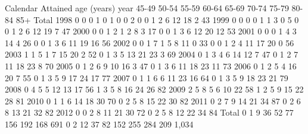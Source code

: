 Calendar  {\VBAR}                         Attained age (years)                        
year      {\VBAR} 45-49  50-54  55-59  60-64  65-69  70-74  75-79  80-84    85+  Total
     1998 {\VBAR}     0      0      0      1      0      1      0      0             2
          {\VBAR}     0      0      1      2      6     12     18      2            43
          {\VBAR} 
     1999 {\VBAR}     0      0      0      0      1      1      3      0             5
          {\VBAR}     0      0      1      2      6     12     19      7            47
          {\VBAR} 
     2000 {\VBAR}     0      0      1      2      1      2      8      3            17
          {\VBAR}     0      0      1      3      6     12     20     12            53
          {\VBAR} 
     2001 {\VBAR}     0      0      0      1      4      3     14      4            26
          {\VBAR}     0      0      1      3      6     11     19     16            56
          {\VBAR} 
     2002 {\VBAR}     0      0      1      7      1      5      8     11      0     33
          {\VBAR}     0      0      1      2      4     11     17     20      0     56
          {\VBAR} 
     2003 {\VBAR}            1      1      5      1      7     15     20      2     52
          {\VBAR}            0      1      3      5     13     21     23      3     69
          {\VBAR} 
     2004 {\VBAR}            0      1      3      4      6     14     12      7     47
          {\VBAR}            0      1      2      7     11     18     23      8     70
          {\VBAR} 
     2005 {\VBAR}            0      1      2      6      9     10     16      3     47
          {\VBAR}            0      1      3      6     11     18     23     11     73
          {\VBAR} 
     2006 {\VBAR}            0      1      2      5      4     16     20      7     55
          {\VBAR}            0      1      3      5      9     17     24     17     77
          {\VBAR} 
     2007 {\VBAR}            0      1      1      6      6     11     23     16     64
          {\VBAR}            0      1      3      5      9     18     23     21     79
          {\VBAR} 
     2008 {\VBAR}                   0      4      5      5     12     13     17     56
          {\VBAR}                   1      3      5      8     16     24     26     82
          {\VBAR} 
     2009 {\VBAR}                   2      5      8      5      6     10     22     58
          {\VBAR}                   1      2      5      9     15     22     28     81
          {\VBAR} 
     2010 {\VBAR}                   0      1      1      6     14     18     30     70
          {\VBAR}                   0      2      5      8     15     22     30     82
          {\VBAR} 
     2011 {\VBAR}                   0      2      7      9     14     21     34     87
          {\VBAR}                   0      2      6      8     13     21     32     82
          {\VBAR} 
     2012 {\VBAR}                   0      0      2      8     11     21     30     72
          {\VBAR}                   0      2      5      8     12     22     34     84
          {\VBAR} 
    Total {\VBAR}     0      1      9     36     52     77    156    192    168    691
          {\VBAR}     0      2     12     37     82    152    255    284    209  1,034
